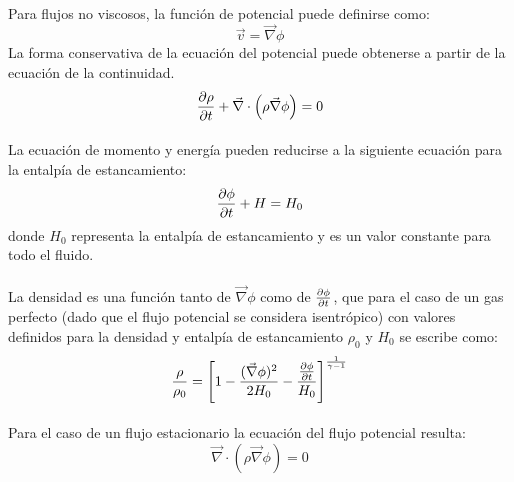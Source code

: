 \documentclass[letterpaper, openright, 12pt]{book}
\begin{document}
    \paragraph*{}
        Para flujos no viscosos, la función de potencial puede definirse
        como:
        \begin{equation}
            \vec{v} = \vec{\nabla} \phi
            \label{u_eq_phi}
        \end{equation}
        La forma conservativa de la ecuación del potencial puede obtenerse a
        partir de la ecuación de la continuidad.
        \begin{equation}
            \pdv{\rho}{t} + \vec{\nabla} \cdot \left( \rho \vec{\nabla} \phi \right) = 0
        \end{equation}

    \paragraph*{}
        La ecuación de momento y energía pueden reducirse a la siguiente
        ecuación para la entalpía de estancamiento:
        \begin{equation}
            \pdv{\phi}{t} + H = H_{0}
        \end{equation}
        donde $H_0$ representa la entalpía de estancamiento y es un valor constante para todo el fluido.

    \paragraph*{}
        La densidad es una función tanto de $\vec{\nabla} \phi$ como de
        $\pdv{\phi}{t}$, que para el caso de un gas perfecto (dado que el
        flujo potencial se considera isentrópico) con valores
        definidos para la densidad y entalpía de estancamiento $\rho_{0}$
        y $H_{0}$ se escribe como:
        \begin{equation}
            \frac{\rho}{\rho_{0}} = \left[ 1
                - \frac{(\vec{\nabla} \phi) ^ 2}{2 H_0}
                - \frac{\pdv{\phi}{t}}{H_0} \right]^{\frac{1}{\gamma - 1}}
            \label{density}
        \end{equation}

    \paragraph*{}
        Para el caso de un flujo estacionario la ecuación del flujo potencial
        resulta:
        \begin{equation}
            \vec{\nabla} \cdot \left( \rho \vec{\nabla} \phi \right) = 0
            \label{stationary_flow}
        \end{equation}
\end{document}
